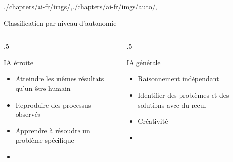 \begin{graphicspathcontext}{{./chapters/ai-fr/imgs/},{./chapters/ai-fr/imgs/auto/},\old}

\begin{frame}[c]{Classification par niveau d'autonomie}
	\begin{columns}
		\begin{column}{.5\linewidth}
			\begin{definitionblock}{IA étroite}
				\begin{itemize}
					\item Atteindre les mêmes résultats qu'un être humain
					\item Reproduire des processus observés
					\item Apprendre à résoudre un problème spécifique
					\item {}
				\end{itemize}
			\end{definitionblock}
		\end{column}
		\begin{column}{.5\linewidth}
			\begin{definitionblock}{IA générale}
				\begin{itemize}
					\item Raisonnement indépendant
					\item Identifier des problèmes et des solutions avec du recul
					\item Créativité
					\item {}
				\end{itemize}
			\end{definitionblock}
		\end{column}
	\end{columns}
\end{frame}

\end{graphicspathcontext}

\endinput

